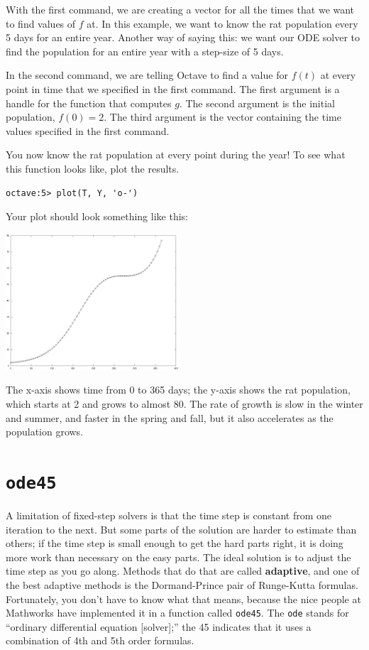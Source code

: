 With the first command, we are creating a vector for all the times that we want
to
find values of $f$ at. In this example, we want to know the rat population every
5 days for an entire year. Another way of saying this: we want our ODE solver
to find the population for an entire year with a step-size of 5 days.

In the second command, we are telling Octave to find a value for $f(t)$ at every
point in time that we specified in the first command. The first argument is a
handle for the function that
computes $g$. The second argument is the initial population, $f(0) = 2$. The
third argument is the vector containing the time values specified in the first
command.

You now know the rat population at every point during the year! To see what
this function looks like, plot the results.

\begin{verbatim}
octave:5> plot(T, Y, 'o-')
\end{verbatim}

Your plot should look something like this:

\beforefig \centerline{\includegraphics[height=2in]{figs/rats.eps}}

The x-axis shows time from 0 to 365 days; the y-axis shows the rat
population, which starts at 2 and grows to almost 80. The rate
of growth is slow in the winter and summer, and faster in the
spring and fall, but it also accelerates as the population grows.


\section{{\tt ode45}}
\label{ode45}




A limitation of fixed-step solvers is that the time step is constant from
one iteration to the next. But some parts of the solution are
harder to estimate than others; if the time step is small enough to
get the hard parts right, it is doing more work than necessary on the
easy parts. The ideal solution is to adjust the time step as you go
along. Methods that do that are called {\bf adaptive}, and one of the
best adaptive methods is the Dormand-Prince pair of Runge-Kutta
formulas. Fortunately, you don't have to know what that means,
because the nice people at Mathworks have implemented it in a function
called {\tt ode45}. The {\tt ode} stands for ``ordinary differential
equation [solver];'' the 45 indicates that it uses a combination of
4th and 5th order formulas.

